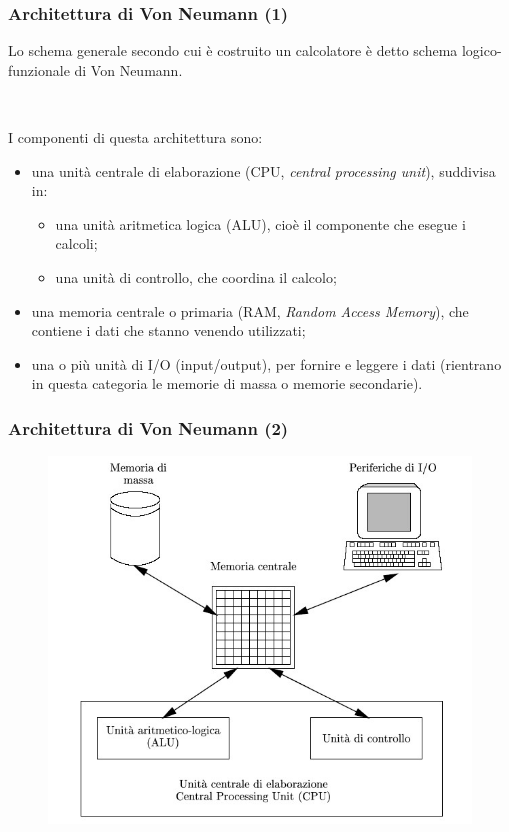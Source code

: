 \documentclass[]{beamer}
\begin{document}
\begin{frame}
\frametitle{Architettura di Von Neumann (1)}
Lo schema generale secondo cui è costruito un calcolatore è detto \alert<1>{schema logico-funzionale di Von Neumann}.\pause

~

I componenti di questa architettura sono:
\begin{itemize}
  \item una \alert<2->{unità centrale di elaborazione} (CPU, \emph{central processing unit}), suddivisa in:\pause
  \begin{itemize}
    \item una \alert<3>{unità aritmetica logica} (ALU), cioè il componente che esegue i calcoli;\pause
    \item una \alert<4>{unità di controllo}, che coordina il calcolo;\pause
  \end{itemize}
  \item una \alert<5->{memoria centrale o primaria} (RAM, \emph{Random Access Memory}), che contiene i dati che stanno venendo utilizzati;\pause
  \item una o più \alert<6>{unità di I/O} (input/output), per fornire e leggere i dati (rientrano in questa categoria le memorie di massa o memorie secondarie).
\end{itemize}
\end{frame}



\begin{frame}
\frametitle{Architettura di Von Neumann (2)}
\begin{figure}
  \includegraphics[width=.7\columnwidth]{img/vonneumann.jpg}
\end{figure}
\end{frame}
\end{document}
